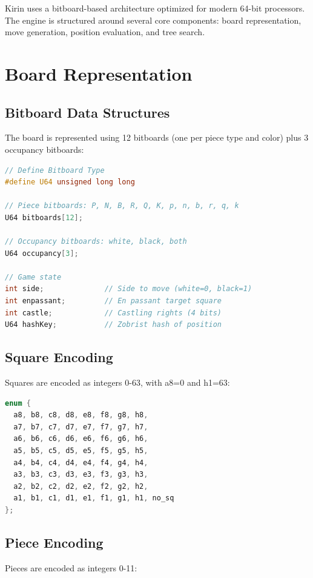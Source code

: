 \documentclass[11pt,a4paper]{report}
\begin{document}
Kirin uses a bitboard-based architecture optimized for modern 64-bit processors. The engine is structured around several core components: board representation, move generation, position evaluation, and tree search.

\section{Board Representation}

\subsection{Bitboard Data Structures}

The board is represented using 12 bitboards (one per piece type and color) plus 3 occupancy bitboards:

\begin{lstlisting}[language=C++]
// Define Bitboard Type
#define U64 unsigned long long

// Piece bitboards: P, N, B, R, Q, K, p, n, b, r, q, k
U64 bitboards[12]; 

// Occupancy bitboards: white, black, both
U64 occupancy[3];

// Game state
int side;              // Side to move (white=0, black=1)
int enpassant;         // En passant target square
int castle;            // Castling rights (4 bits)
U64 hashKey;           // Zobrist hash of position
\end{lstlisting}

\subsection{Square Encoding}

Squares are encoded as integers 0-63, with a8=0 and h1=63:

\begin{lstlisting}[language=C++]
enum {
  a8, b8, c8, d8, e8, f8, g8, h8,
  a7, b7, c7, d7, e7, f7, g7, h7,
  a6, b6, c6, d6, e6, f6, g6, h6,
  a5, b5, c5, d5, e5, f5, g5, h5,
  a4, b4, c4, d4, e4, f4, g4, h4,
  a3, b3, c3, d3, e3, f3, g3, h3,
  a2, b2, c2, d2, e2, f2, g2, h2,
  a1, b1, c1, d1, e1, f1, g1, h1, no_sq
};
\end{lstlisting}

\subsection{Piece Encoding}

Pieces are encoded as integers 0-11:
\end{document}
